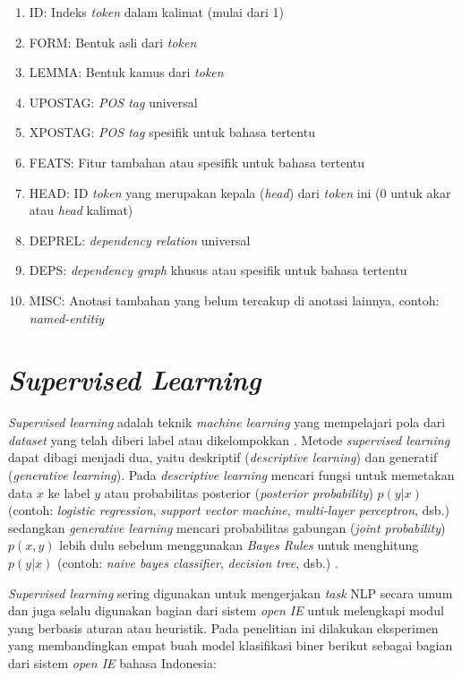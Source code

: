 \begin{enumerate}
	\item ID: Indeks \textit{token} dalam kalimat (mulai dari 1)
	\item FORM: Bentuk asli dari \textit{token}
	\item LEMMA: Bentuk kamus dari \textit{token}
	\item UPOSTAG: \textit{POS tag} universal
	\item XPOSTAG: \textit{POS tag} spesifik untuk bahasa tertentu
	\item FEATS: Fitur tambahan atau spesifik untuk bahasa tertentu
	\item HEAD: ID \textit{token} yang merupakan kepala (\textit{head}) dari \textit{token} ini (0 untuk akar atau \textit{head} kalimat)
	\item DEPREL: \textit{dependency relation} universal
	\item DEPS: \textit{dependency graph} khusus atau spesifik untuk bahasa tertentu
	\item MISC: Anotasi tambahan yang belum tercakup di anotasi lainnya, contoh: \textit{named-entitiy}
\end{enumerate}

\section{\textit{Supervised Learning}}

\textit{Supervised learning} adalah teknik \textit{machine learning} yang mempelajari pola dari \textit{dataset} yang telah diberi label atau dikelompokkan \citep{mohri2012foundations}. Metode \textit{supervised learning} dapat dibagi menjadi dua, yaitu deskriptif (\textit{descriptive learning}) dan generatif (\textit{generative learning}). Pada \textit{descriptive learning} mencari fungsi untuk memetakan data $x$ ke label $y$ atau probabilitas posterior (\textit{posterior probability}) $p(y|x)$ (contoh: \textit{logistic regression}, \textit{support vector machine}, \textit{multi-layer perceptron}, dsb.) sedangkan \textit{generative learning} mencari probabilitas gabungan (\textit{joint probability}) $p(x,y)$ lebih dulu sebelum menggunakan \textit{Bayes Rules} untuk menghitung $p(y|x)$ (contoh: \textit{naive bayes classifier}, \textit{decision tree}, dsb.) \citep{ng2002discriminative}. 

\textit{Supervised learning} sering digunakan untuk mengerjakan \textit{task} NLP secara umum dan juga selalu digunakan bagian dari sistem \textit{open IE} untuk melengkapi modul yang berbasis aturan atau heuristik. Pada penelitian ini dilakukan eksperimen yang membandingkan empat buah model klasifikasi biner berikut sebagai bagian dari sistem \textit{open IE} bahasa Indonesia:

